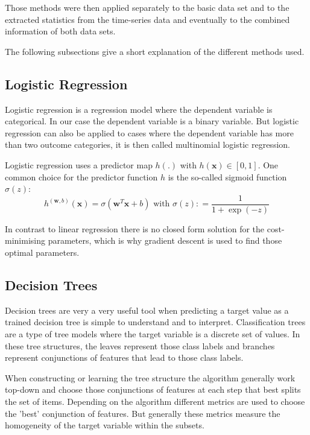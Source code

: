 \documentclass[a4paper,11pt]{article}
\begin{document}
Those methods were then applied separately to the basic data set and to the extracted statistics from the time-series data and eventually to the combined information of both data sets.

The following subsections give a short explanation of the different methods used.

\subsection*{Logistic Regression}

Logistic regression is a regression model where the dependent variable is categorical. In our case the dependent variable is a binary variable. But logistic regression can also be applied to cases where the dependent variable has more than two outcome categories, it is then called multinomial logistic regression.

Logistic regression uses a  predictor map $ h(.)$ with $h ( \mathbf { x } ) \in [ 0,1] $. One common choice for the predictor function $h$ is the so-called sigmoid function $ \sigma ( z ) $:
$$ h ^ { ( \mathbf { w } ,b ) } ( \mathbf { x } ) = \sigma \left( \mathbf { w } ^ { T } \mathbf { x } + b \right) \text{ with } \sigma ( z ) : = \frac{1}{1+ \exp ( - z )}  $$

In contrast to linear regression there is no closed form solution for the cost-minimising parameters, which is why gradient descent is used to find those optimal parameters.

\subsection*{Decision Trees}

Decision trees are very a very useful tool when predicting a target value as a trained decision tree is simple to understand and to interpret. Classification trees are a type of tree models where the target variable is a discrete set of values. In these tree structures, the leaves represent those class labels and branches represent conjunctions of features that lead to those class labels.

When constructing or learning the tree structure the algorithm generally work top-down and choose those conjunctions of features at each step that best splits the set of items. Depending on the algorithm different metrics are used to choose the 'best' conjunction of features. But generally these metrics measure the homogeneity of the target variable within the subsets.
\end{document}
